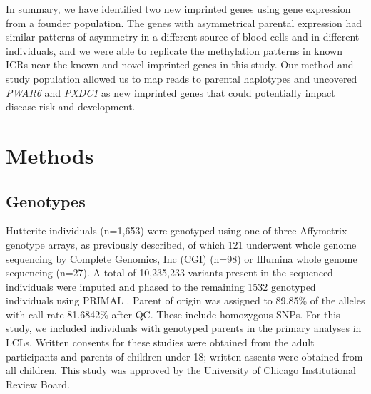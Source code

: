 In summary, we have identified two new imprinted genes using gene expression from a founder population. The genes with asymmetrical parental expression had similar patterns of asymmetry in a different source of blood cells and in different individuals, and we were able to replicate the methylation patterns in known ICRs near the known and novel imprinted genes in this study. Our method and study population allowed us to map reads to parental haplotypes and uncovered \emph{PWAR6} and \emph{PXDC1} as new imprinted genes that could potentially impact disease risk and development.

\section{Methods}\label{ch03-methods}

\subsection{Genotypes}\label{Genotypes}
Hutterite individuals (n=1,653) were genotyped using one of three Affymetrix genotype arrays, as previously described\citep{Livne2015}, of which 121 underwent whole genome sequencing by Complete Genomics, Inc (CGI) (n=98) or Illumina whole genome sequencing (n=27). A total of 10,235,233 variants present in the sequenced individuals were imputed and phased to the remaining 1532 genotyped individuals using PRIMAL \citep{Livne2015}. Parent of origin was assigned to 89.85\% of the alleles with call rate 81.6842\% after QC. These include homozygous SNPs. For this study, we included individuals with genotyped parents in the primary analyses in LCLs. Written consents for these studies were obtained from the adult participants and parents of children under 18; written assents were obtained from all children. This study was approved by the University of Chicago Institutional Review Board.   

